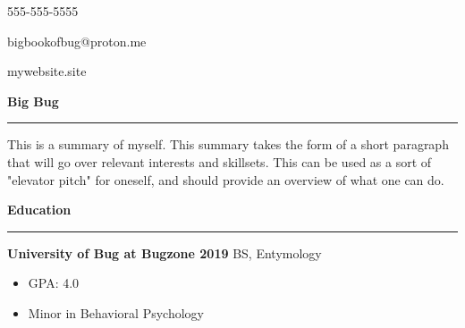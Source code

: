 \documentclass[a4paper, 12pt]{article}
\begin{document}
\begin{flushright}
{\fontsize{12pt}{12pt}\selectfont
\item 555-555-5555
 \item bigbookofbug@proton.me
 \item mywebsite.site
 }\end{flushright}
\vspace{-40pt}
\begin{flushleft}
{\fontsize{16pt}{16pt}\selectfont
{\textbf{Big Bug}}}
\noindent\rule{\textwidth}{0.4pt}
\end{flushleft}
\begin{flushleft}
{\fontsize{12pt}{12pt}\selectfont
This is a summary of myself. This summary takes the form of a short paragraph that will go over relevant interests and skillsets. This can be used as a sort of "elevator pitch" for oneself, and should provide an overview of what one can do.}
\newline
\end{flushleft}
\begin{flushleft}
{\fontsize{12pt}{12pt}\selectfont
\textbf{Education}}
\noindent\rule{\textwidth}{0.4pt}
\end{flushleft}
\begin{flushleft}
{\textbf{University of Bug at Bugzone \hfill 2019}}
\newline
BS, Entymology\begin{multicols}{2}
\begin{itemize}
\item GPA: 4.0
 \item Minor in Behavioral Psychology
 \end{itemize}
\end{multicols}
\end{flushleft}
\end{document}

